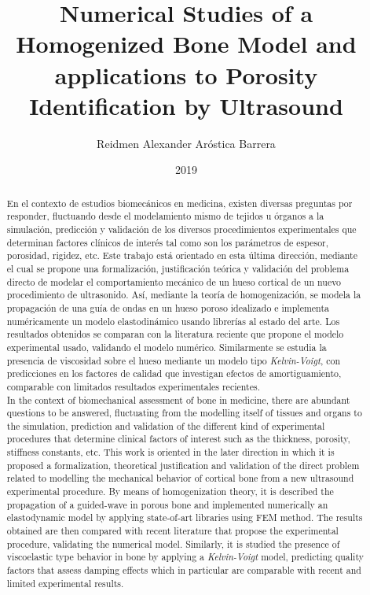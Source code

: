 \documentclass[upright, contnum]{umemoria}
\author{Reidmen Alexander Aróstica Barrera}
\title{Numerical Studies of a Homogenized Bone Model and applications to Porosity Identification by Ultrasound}
\date{2019}
\begin{document}
\frontmatter
\maketitle

\begin{abstract}
En el contexto de estudios biomecánicos en medicina, existen diversas preguntas por responder, fluctuando desde el modelamiento mismo de tejidos u órganos a la simulación, predicción y validación de los diversos procedimientos experimentales que determinan factores clínicos de interés tal como son los parámetros de espesor, porosidad, rigidez, etc. Este trabajo está orientado en esta última dirección, mediante el cual se propone una formalización, justificación teórica y validación del problema directo de modelar el comportamiento mecánico de un hueso cortical de un nuevo procedimiento de ultrasonido. Así, mediante la teoría de homogenización, se modela la propagación de una guía de ondas en un hueso poroso idealizado e implementa numéricamente un modelo elastodinámico usando librerías al estado del arte. Los resultados obtenidos se comparan con la literatura reciente que propone el modelo experimental usado, validando el modelo numérico. Similarmente se estudia la presencia de viscosidad sobre el hueso mediante un modelo tipo \textit{Kelvin-Voigt}, con predicciones en los factores de calidad que investigan efectos de amortiguamiento, comparable con limitados resultados experimentales recientes. \\

In the context of biomechanical assessment of bone in medicine, there are abundant questions to be answered, fluctuating from the modelling itself of tissues and organs to the simulation, prediction and validation of the different kind of experimental procedures that determine clinical factors of interest such as the thickness, porosity, stiffness constants, etc. This work is oriented in the later direction in which it is proposed a formalization, theoretical justification and validation of the direct problem related to modelling the mechanical behavior of cortical bone from a new ultrasound experimental procedure. By means of homogenization theory, it is described the propagation of a guided-wave in porous bone and implemented numerically an elastodynamic model by applying state-of-art libraries using FEM method. The results obtained are then compared with recent literature that propose the experimental procedure, validating the numerical model. Similarly, it is studied the presence of viscoelastic type behavior in bone by applying a \textit{Kelvin-Voigt} model, predicting quality factors that assess damping effects which in particular are comparable with recent and limited experimental results.
\end{abstract}
\end{document}
